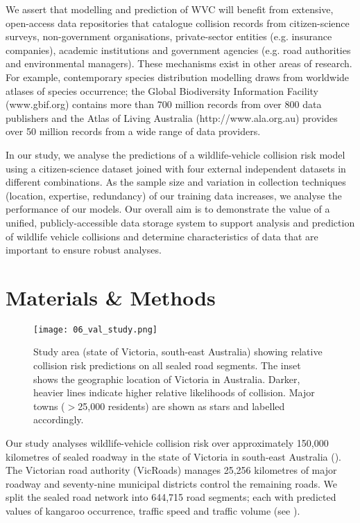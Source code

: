 We assert that modelling and prediction of WVC will benefit from extensive, open-access data repositories that catalogue collision records from citizen-science surveys, non-government organisations, private-sector entities (e.g. insurance companies), academic institutions and government agencies (e.g. road authorities and environmental managers). These mechanisms exist in other areas of research. For example, contemporary species distribution modelling draws from worldwide atlases of species occurrence; the Global Biodiversity Information Facility (www.gbif.org) contains more than 700 million records from over 800 data publishers and the Atlas of Living Australia (http://www.ala.org.au) provides over 50 million records from a wide range of data providers.

In our study, we analyse the predictions of a wildlife-vehicle collision risk model using a citizen-science dataset joined with four external independent datasets in different combinations. As the sample size and variation in collection techniques (location, expertise, redundancy) of our training data increases, we analyse the performance of our models. Our overall aim is to demonstrate the value of a unified, publicly-accessible data storage system to support analysis and prediction of wildlife vehicle collisions and determine characteristics of data that are important to ensure robust analyses.

\section{Materials \& Methods}

\begin{figure*}[htp]
  \centering
  \texttt{[image: 06\_val\_study.png]}
  \caption[Wildlife-vehicle collision predictions in Victoria]{Study area (state of Victoria, south-east Australia) showing relative collision risk predictions on all sealed road segments. The inset shows the geographic location of Victoria in Australia. Darker, heavier lines indicate higher relative likelihoods of collision. Major towns ($>$25,000 residents) are shown as stars and labelled accordingly.}
  \label{val_study_area}
\end{figure*}

Our study analyses wildlife-vehicle collision risk over approximately 150,000 kilometres of sealed roadway in the state of Victoria in south-east Australia (). The Victorian road authority (VicRoads) manages 25,256 kilometres of major roadway and seventy-nine municipal districts control the remaining roads. We split the sealed road network into 644,715 road segments; each with predicted values of kangaroo occurrence, traffic speed and traffic volume (see ).

